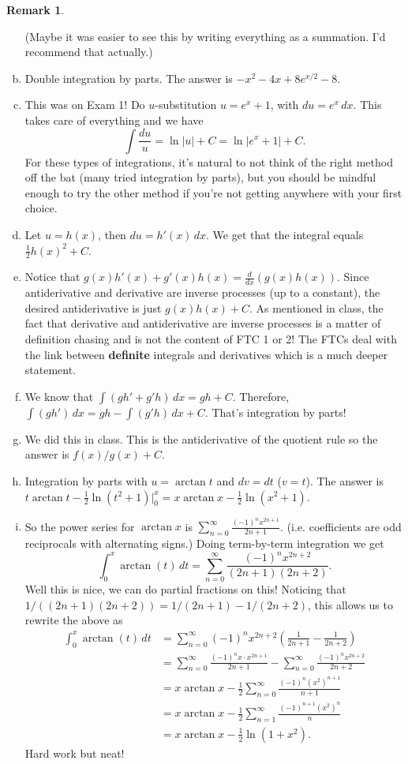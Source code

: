 \documentclass[11pt,oneside]{amsart}
\theoremstyle{definition}
\newtheorem{remark}{Remark}
\begin{document}
\begin{remark}
\begin{enumerate}[(a)]
          (Maybe it was easier to see this by writing everything as a summation. I'd recommend that actually.)
    \item Double integration by parts. The answer is $-x^2-4x+8e^{x/2}-8$.
    \item This was on Exam 1! Do $u$-substitution $u=e^x+1$, with $du=e^x\,dx$. This takes care of everything and we have
          \[\int \frac{du}u=\ln|u|+C=\ln|e^x+1|+C.\]
          For these types of integrations, it's natural to not think of the right method off the bat (many tried integration by parts), but you should be mindful enough to try the other method if you're not getting anywhere with your first choice.
    \item Let $u=h(x)$, then $du=h'(x)\,dx$. We get that the integral equals $\frac12h(x)^2+C$.
    \item Notice that $g(x)h'(x)+g'(x)h(x)=\frac d{dx}(g(x)h(x))$. Since antiderivative and derivative are inverse processes (up to a constant), the desired antiderivative is just $g(x)h(x)+C$. As mentioned in class, the fact that derivative and antiderivative are inverse processes is a matter of definition chasing and is not the content of FTC 1 or 2! The FTCs deal with the link between \textbf{definite} integrals and derivatives which is a much deeper statement.
    \item We know that $\int(gh'+g'h)\,dx=gh+C$. Therefore, $\int(gh')\,dx=gh-\int(g'h)\,dx+C$. That's integration by parts!
    \item We did this in class. This is the antiderivative of the quotient rule so the answer is $f(x)/g(x)+C$.
    \item Integration by parts with $u=\arctan t$ and $dv=dt$ ($v=t$). The answer is $t\arctan t-\frac 12\ln(t^2+1)\Big|_0^x=x\arctan x-\frac 12\ln(x^2+1)$.
    \item So the power series for $\arctan x$ is $\sum_{n=0}^\infty\frac{(-1)^nx^{2n+1}}{2n+1}$. (i.e. coefficients are odd reciprocals with alternating signs.) Doing term-by-term integration we get
          \[\int_0^x\arctan(t)\,dt=\sum_{n=0}^\infty\frac{(-1)^nx^{2n+2}}{(2n+1)(2n+2)}.\]
          Well this is nice, we can do partial fractions on this! Noticing that $1/((2n+1)(2n+2))=1/(2n+1)-1/(2n+2)$, this allows us to rewrite the above as
          \[\begin{split}
              \int_0^x\arctan(t)\,dt&=\sum_{n=0}^\infty (-1)^nx^{2n+2}\left( \frac 1{2n+1}-\frac 1{2n+2} \right)\\
              &=\sum_{n=0}^\infty\frac{(-1)^n x\cdot x^{2n+1}}{2n+1}-\sum_{n=0}^\infty\frac{(-1)^nx^{2n+2}}{2n+2}\\
              &=x\arctan x-\frac 12\sum_{n=0}^\infty\frac{(-1)^n (x^2)^{n+1}}{n+1}\\
              &=x\arctan x-\frac 12\sum_{n=1}^\infty\frac{(-1)^{n+1} (x^2)^{n}}{n}\\
              &= x\arctan x-\frac 12\ln(1+x^2).
            \end{split}\]
          Hard work but neat!
  \end{enumerate}
\end{remark}
\end{document}
